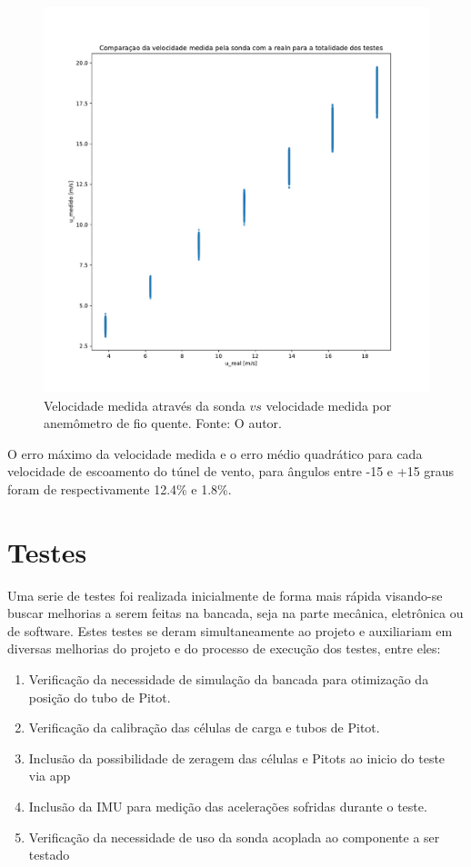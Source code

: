\begin{figure}[!ht]
    \centering
    \includegraphics[width=.8\linewidth]{figuras/calibracao/u_ver_plot.pdf}
    \caption{Velocidade medida através da sonda $vs$ velocidade medida por anemômetro de fio quente. Fonte: O autor.}
    \label{fig:U_alpha}
\end{figure}

O erro máximo da velocidade medida e o erro médio quadrático para cada velocidade de escoamento do túnel de vento, para ângulos entre -15 e +15 graus foram de respectivamente 12.4\% e 1.8\%.

\section{Testes}

Uma serie de testes foi realizada inicialmente de forma mais rápida visando-se buscar melhorias a serem feitas na bancada, seja na parte mecânica, eletrônica ou de software. Estes testes se deram simultaneamente ao projeto e auxiliariam em diversas melhorias do projeto e do processo de execução dos testes, entre eles:

\begin{enumerate}
    \item Verificação da necessidade de simulação da bancada para otimização da posição do tubo de Pitot.
    \item Verificação da calibração das células de carga e tubos de Pitot.
    \item Inclusão da possibilidade de zeragem das células e Pitots ao inicio do teste via app
    \item Inclusão da IMU para medição das acelerações sofridas durante o teste.
    \item Verificação da necessidade de uso da sonda acoplada ao componente a ser testado
\end{enumerate}

